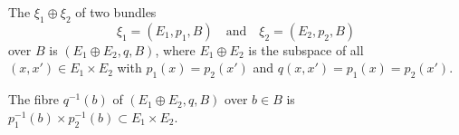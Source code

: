 The  $\xi_1 \oplus \xi_2$ of two bundles
$$\xi_1 = (E_1, p_1, B) \quad \text{and} \quad \xi_2 = (E_2, p_2, B)$$
over $B$ is $(E_1 \oplus E_2, q, B)$, where $E_1 \oplus E_2$ is the subspace of all $(x, x') \in E_1 \times E_2$ with $p_1(x) = p_2(x')$ and $q(x, x') = p_1(x) = p_2(x')$.

The fibre $q^{-1}(b)$ of $(E_1 \oplus E_2, q, B)$ over $b \in B$ is $p_1^{-1}(b) \times p_2^{-1}(b) \subset E_1 \times E_2$.
